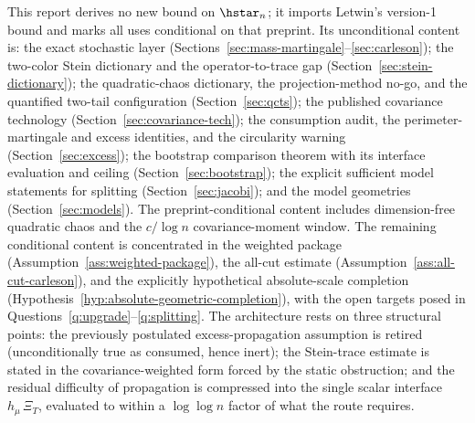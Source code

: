 \documentclass[../../main.tex]{subfiles}
\begin{document}
This report derives no new bound on $\hstar_n$; it imports Letwin's version-1 bound and marks all
uses conditional on that preprint. Its unconditional content is: the exact stochastic
layer (Sections~\ref{sec:mass-martingale}--\ref{sec:carleson}); the two-color Stein dictionary
and the operator-to-trace gap (Section~\ref{sec:stein-dictionary}); the quadratic-chaos
dictionary, the projection-method no-go, and the quantified two-tail configuration
(Section~\ref{sec:qcts}); the published covariance technology
(Section~\ref{sec:covariance-tech}); the consumption audit, the perimeter-martingale and
excess identities, and the circularity warning (Section~\ref{sec:excess}); the bootstrap
comparison theorem with its interface evaluation and ceiling (Section~\ref{sec:bootstrap}); the
explicit sufficient model statements for splitting (Section~\ref{sec:jacobi}); and the model
geometries (Section~\ref{sec:models}). The preprint-conditional content includes dimension-free
quadratic chaos and the $c/\log n$ covariance-moment window. The remaining conditional content is concentrated in the weighted
package (Assumption~\ref{ass:weighted-package}), the all-cut estimate
(Assumption~\ref{ass:all-cut-carleson}), and the explicitly hypothetical absolute-scale
completion (Hypothesis~\ref{hyp:absolute-geometric-completion}), with the open targets posed in
Questions~\ref{q:upgrade}--\ref{q:splitting}. The architecture rests on three structural
points: the previously postulated excess-propagation assumption is retired (unconditionally
true as consumed, hence inert); the Stein-trace estimate is stated in the covariance-weighted
form forced by the static obstruction; and the residual difficulty of propagation is
compressed into the single scalar interface $h_\mu\,\Xi_T$, evaluated to within a
$\log\log n$ factor of what the route requires.
\end{document}

